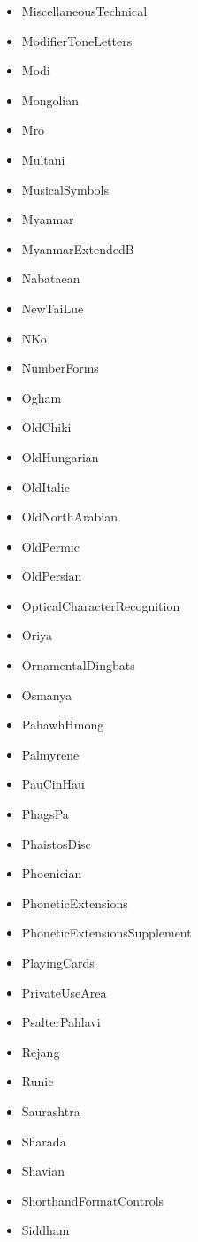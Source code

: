 ﻿\documentclass{article}
\newenvironment{itemlist}{%
  \begin{itemize}
	\setlength{\itemsep}{0pt}
	\setlength{\parsep}{0pt}
	\setlength{\topsep}{0pt}
	\setlength{\partopsep}{0pt}
	\setlength{\parskip}{0pt}
	\setlength{\labelsep}{5pt}}%
{
  \end{itemize}}
\begin{document}
\begin{multicols}{2}
\begin{itemlist}
				\item MiscellaneousTechnical
				\item ModifierToneLetters
				\item Modi
				\item Mongolian
				\item Mro
				\item Multani
				\item MusicalSymbols
				\item Myanmar
				\item MyanmarExtendedB
				\item Nabataean
				\item NewTaiLue
				\item NKo
				\item NumberForms
				\item Ogham
				\item OldChiki
				\item OldHungarian
				\item OldItalic
				\item OldNorthArabian
				\item OldPermic
				\item OldPersian
				\item OpticalCharacterRecognition
				\item Oriya
				\item OrnamentalDingbats
				\item Osmanya
				\item PahawhHmong
				\item Palmyrene
				\item PauCinHau
				\item PhagsPa
				\item PhaistosDisc
				\item Phoenician
				\item PhoneticExtensions
				\item PhoneticExtensionsSupplement
				\item PlayingCards
				\item PrivateUseArea
				\item PsalterPahlavi
				\item Rejang
				\item Runic
				\item Saurashtra
				\item Sharada
				\item Shavian
				\item ShorthandFormatControls
				\item Siddham

\end{itemlist}
\end{multicols}
\end{document}
